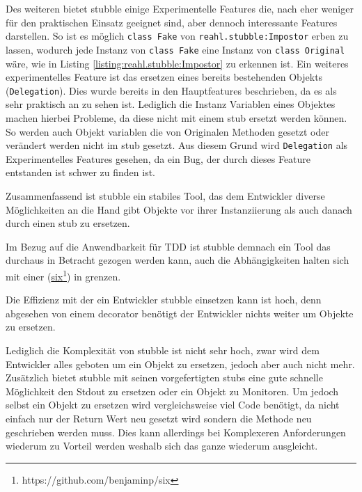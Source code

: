 Des weiteren bietet stubble einige Experimentelle Features die, nach \cite{reahl.stubble:4.0} eher
weniger für den praktischen Einsatz geeignet sind, aber dennoch interessante Features darstellen.
So ist es möglich \lstinline{class Fake} von \lstinline{reahl.stubble:Impostor} erben zu lassen,
wodurch jede Instanz von \lstinline{class Fake} eine Instanz von \lstinline{class Original} wäre,
wie in Listing \ref{listing:reahl.stubble:Impostor} zu erkennen ist.
Ein weiteres experimentelles Feature ist das ersetzen eines bereits bestehenden Objekts
(\lstinline{Delegation}). Dies wurde bereits in den Hauptfeatures beschrieben, da es als sehr
praktisch an zu sehen ist. Lediglich die Instanz Variablen eines Objektes machen hierbei Probleme, da
diese nicht mit einem \Gls{stub} ersetzt werden können. So werden auch Objekt variablen die von
Originalen Methoden gesetzt oder verändert werden nicht im \Gls{stub} gesetzt.
Aus diesem Grund wird \lstinline{Delegation} als Experimentelles Features gesehen, da ein Bug, der
durch dieses Feature entstanden ist schwer zu finden ist.

Zusammenfassend ist stubble ein stabiles Tool, das dem Entwickler diverse Möglichkeiten an die Hand
gibt Objekte vor ihrer Instanziierung als auch danach durch einen \Gls{stub} zu ersetzen.

Im Bezug auf die Anwendbarkeit für TDD ist stubble demnach ein Tool das durchaus in Betracht gezogen
werden kann, auch die Abhängigkeiten halten sich mit einer
(\href{https://github.com/benjaminp/six}{six}\footnote{https://github.com/benjaminp/six}) in grenzen.

Die Effizienz mit der ein Entwickler stubble einsetzen kann ist hoch, denn abgesehen von einem
\gls{decorator} benötigt der Entwickler nichts weiter um Objekte zu ersetzen.

Lediglich die Komplexität von stubble ist nicht sehr hoch, zwar wird dem Entwickler alles geboten um
ein Objekt zu ersetzen, jedoch aber auch nicht mehr. Zusätzlich bietet stubble mit seinen
vorgefertigten \Glspl{stub} eine gute schnelle Möglichkeit den Stdout zu ersetzen oder ein Objekt
zu Monitoren. Um jedoch selbst ein Objekt zu ersetzen wird vergleichsweise viel Code benötigt, da
nicht einfach nur der Return Wert neu gesetzt wird sondern die Methode neu geschrieben werden muss.
Dies kann allerdings bei Komplexeren Anforderungen wiederum zu Vorteil werden weshalb sich das ganze
wiederum ausgleicht.

